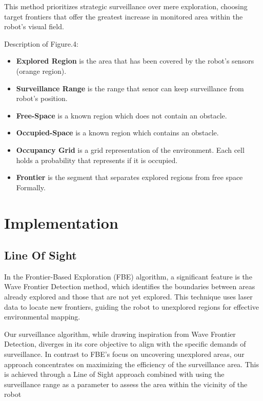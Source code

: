 This method prioritizes strategic surveillance over mere exploration, choosing target frontiers that offer the greatest increase in monitored area within the robot's visual field.


Description of Figure.4:
\begin{itemize}
    \item \textbf{Explored Region} is the area  that has been covered  by the robot’s sensors (orange region).
    \item \textbf{Surveillance Range} is the range that senor can keep surveillance from robot's position.
    \item \textbf{Free-Space} is a known region which does not contain an obstacle.
    \item \textbf{Occupied-Space} is a known region which contains an obstacle.
    \item \textbf{Occupancy Grid} is a grid representation of the environment. Each cell holds a probability that represents if it is occupied.
    \item \textbf{Frontier} is the segment that separates explored regions from free space Formally.
\end{itemize}


\section{Implementation}
\label{sec:Implementation}

\subsection{Line Of Sight}
\label{sec:line of sight}

In the Frontier-Based Exploration (FBE) algorithm, a significant feature is the Wave Frontier Detection method, which identifies the boundaries between areas already explored and those that are not yet explored. This technique uses laser data to locate new frontiers, guiding the robot to unexplored regions for effective environmental mapping.

Our surveillance algorithm, while drawing inspiration from Wave Frontier Detection, diverges in its core objective to align with the specific demands of surveillance. In contrast to FBE's focus on uncovering unexplored areas, our approach concentrates on maximizing the efficiency of the surveillance area. This is achieved through a Line of Sight approach combined with using the surveillance range as a parameter to assess the area within the vicinity of the robot

